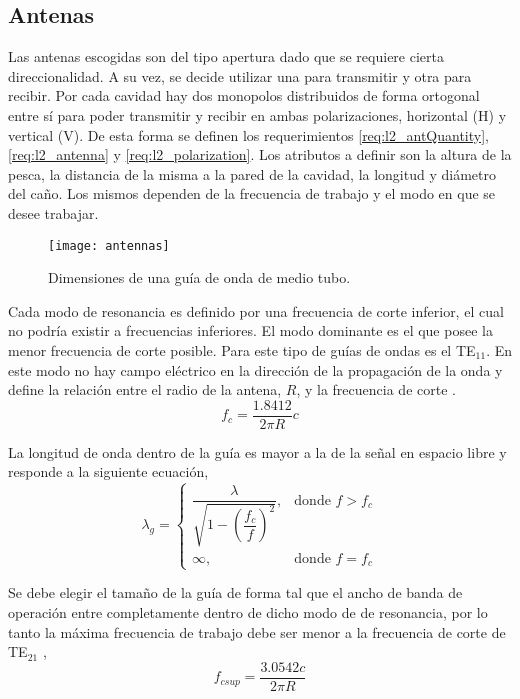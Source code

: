\subsection{Antenas}

Las antenas escogidas son del tipo apertura dado que se requiere cierta direccionalidad. A su vez, se decide utilizar una para transmitir y otra para recibir. Por cada cavidad hay dos monopolos distribuidos de forma ortogonal entre sí para poder transmitir y recibir en ambas polarizaciones, horizontal (H) y vertical (V). De esta forma se definen los requerimientos \ref{req:l2_antQuantity}, \ref{req:l2_antenna} y \ref{req:l2_polarization}. Los atributos a definir son la altura de la pesca, la distancia de la misma a la pared de la cavidad, la longitud y diámetro del caño. Los mismos dependen de la frecuencia de trabajo y el modo en que se desee trabajar.

\begin{figure}
 \centering
 \texttt{[image: antennas]}
 \caption{Dimensiones de una guía de onda de medio tubo.}
 \label{fig:antennas}
\end{figure}

Cada modo de resonancia es definido por una frecuencia de corte inferior, el cual no podría existir a frecuencias inferiores. El modo dominante es el que posee la menor frecuencia de corte posible. Para este tipo de guías de ondas es el TE$_{11}$. En este modo no hay campo eléctrico en la dirección de la propagación de la onda y define la relación entre el radio de la antena, $R$, y la frecuencia de corte \cite{circularWaveguides}.
\begin{equation} \label{eq:freqInf}
  f_c = \dfrac{\num{1.8412}}{2\pi R} c
\end{equation}

La longitud de onda dentro de la guía es mayor a la de la señal en espacio libre y responde a la siguiente ecuación,
\begin{equation} \label{eq:lambdaInGuide}
\lambda_g = \begin{cases} \dfrac{\lambda}{\sqrt{1 - (\dfrac{f_c}{f})^2}}, & \mbox{donde } f > f_c \\ \infty, & \mbox{donde } f = f_c \end{cases}
\end{equation}

Se debe elegir el tamaño de la guía de forma tal que el ancho de banda de operación entre completamente dentro de dicho modo de de resonancia, por lo tanto la máxima frecuencia de trabajo debe ser menor a la frecuencia de corte de TE$_{21}$ \cite{circularWaveguides},
\begin{equation} \label{eq:freqSup}
  f_{csup} = \dfrac{\num{3.0542}c}{2\pi R}
\end{equation}

